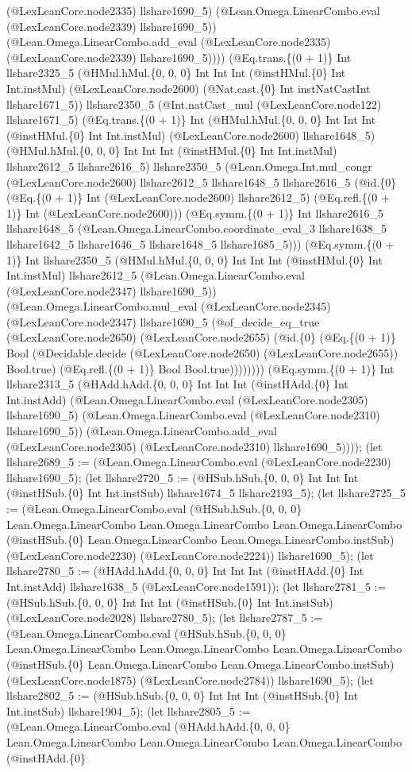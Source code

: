 \documentclass[11pt]{article}
\begin{document}
(@LexLeanCore.node2335) llshare1690\_5) (@Lean.Omega.LinearCombo.eval (@LexLeanCore.node2339) llshare1690\_5)) (@Lean.Omega.LinearCombo.add\_eval (@LexLeanCore.node2335) (@LexLeanCore.node2339) llshare1690\_5)))) (@Eq.trans.\{(0 + 1)\} Int llshare2325\_5 (@HMul.hMul.\{0, 0, 0\} Int Int Int (@instHMul.\{0\} Int Int.instMul) (@LexLeanCore.node2600) (@Nat.cast.\{0\} Int instNatCastInt llshare1671\_5)) llshare2350\_5 (@Int.natCast\_mul (@LexLeanCore.node122) llshare1671\_5) (@Eq.trans.\{(0 + 1)\} Int (@HMul.hMul.\{0, 0, 0\} Int Int Int (@instHMul.\{0\} Int Int.instMul) (@LexLeanCore.node2600) llshare1648\_5) (@HMul.hMul.\{0, 0, 0\} Int Int Int (@instHMul.\{0\} Int Int.instMul) llshare2612\_5 llshare2616\_5) llshare2350\_5 (@Lean.Omega.Int.mul\_congr (@LexLeanCore.node2600) llshare2612\_5 llshare1648\_5 llshare2616\_5 (@id.\{0\} (@Eq.\{(0 + 1)\} Int (@LexLeanCore.node2600) llshare2612\_5) (@Eq.refl.\{(0 + 1)\} Int (@LexLeanCore.node2600))) (@Eq.symm.\{(0 + 1)\} Int llshare2616\_5 llshare1648\_5 (@Lean.Omega.LinearCombo.coordinate\_eval\_3 llshare1638\_5 llshare1642\_5 llshare1646\_5 llshare1648\_5 llshare1685\_5))) (@Eq.symm.\{(0 + 1)\} Int llshare2350\_5 (@HMul.hMul.\{0, 0, 0\} Int Int Int (@instHMul.\{0\} Int Int.instMul) llshare2612\_5 (@Lean.Omega.LinearCombo.eval (@LexLeanCore.node2347) llshare1690\_5)) (@Lean.Omega.LinearCombo.mul\_eval (@LexLeanCore.node2345) (@LexLeanCore.node2347) llshare1690\_5 (@of\_decide\_eq\_true (@LexLeanCore.node2650) (@LexLeanCore.node2655) (@id.\{0\} (@Eq.\{(0 + 1)\} Bool (@Decidable.decide (@LexLeanCore.node2650) (@LexLeanCore.node2655)) Bool.true) (@Eq.refl.\{(0 + 1)\} Bool Bool.true)))))))) (@Eq.symm.\{(0 + 1)\} Int llshare2313\_5 (@HAdd.hAdd.\{0, 0, 0\} Int Int Int (@instHAdd.\{0\} Int Int.instAdd) (@Lean.Omega.LinearCombo.eval (@LexLeanCore.node2305) llshare1690\_5) (@Lean.Omega.LinearCombo.eval (@LexLeanCore.node2310) llshare1690\_5)) (@Lean.Omega.LinearCombo.add\_eval (@LexLeanCore.node2305) (@LexLeanCore.node2310) llshare1690\_5)))); (let llshare2689\_5 := (@Lean.Omega.LinearCombo.eval (@LexLeanCore.node2230) llshare1690\_5); (let llshare2720\_5 := (@HSub.hSub.\{0, 0, 0\} Int Int Int (@instHSub.\{0\} Int Int.instSub) llshare1674\_5 llshare2193\_5); (let llshare2725\_5 := (@Lean.Omega.LinearCombo.eval (@HSub.hSub.\{0, 0, 0\} Lean.Omega.LinearCombo Lean.Omega.LinearCombo Lean.Omega.LinearCombo (@instHSub.\{0\} Lean.Omega.LinearCombo Lean.Omega.LinearCombo.instSub) (@LexLeanCore.node2230) (@LexLeanCore.node2224)) llshare1690\_5); (let llshare2780\_5 := (@HAdd.hAdd.\{0, 0, 0\} Int Int Int (@instHAdd.\{0\} Int Int.instAdd) llshare1638\_5 (@LexLeanCore.node1591)); (let llshare2781\_5 := (@HSub.hSub.\{0, 0, 0\} Int Int Int (@instHSub.\{0\} Int Int.instSub) (@LexLeanCore.node2028) llshare2780\_5); (let llshare2787\_5 := (@Lean.Omega.LinearCombo.eval (@HSub.hSub.\{0, 0, 0\} Lean.Omega.LinearCombo Lean.Omega.LinearCombo Lean.Omega.LinearCombo (@instHSub.\{0\} Lean.Omega.LinearCombo Lean.Omega.LinearCombo.instSub) (@LexLeanCore.node1875) (@LexLeanCore.node2784)) llshare1690\_5); (let llshare2802\_5 := (@HSub.hSub.\{0, 0, 0\} Int Int Int (@instHSub.\{0\} Int Int.instSub) llshare1904\_5); (let llshare2805\_5 := (@Lean.Omega.LinearCombo.eval (@HAdd.hAdd.\{0, 0, 0\} Lean.Omega.LinearCombo Lean.Omega.LinearCombo Lean.Omega.LinearCombo (@instHAdd.\{0\} 
\end{document}
